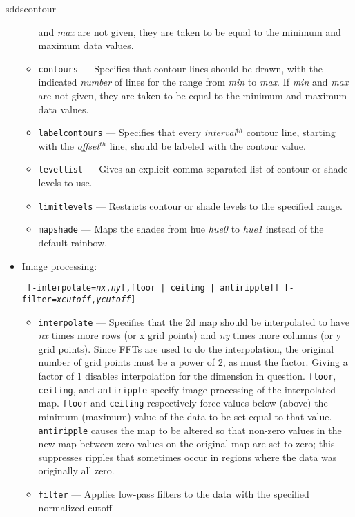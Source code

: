 \begin{sddsprog}{sddscontour}
\begin{itemize}
\begin{itemize}
        and {\em max} are not given, they are taken to be equal to the minimum and maximum data values.
        \item \verb|contours| --- Specifies that contour lines should be drawn, with the
        indicated {\em number} of lines for the range from {\em min} to {\em max}.  If {\em min}
        and {\em max} are not given, they are taken to be equal to the minimum and maximum data values.
        \item \verb|labelcontours| --- Specifies that every {\em interval}$^{th}$ contour line, starting with
        the {\em offset}$^{th}$ line, should be labeled with the contour value.
        \item \verb|levellist| --- Gives an explicit comma-separated list of contour or shade levels to use.
        \item \verb|limitlevels| --- Restricts contour or shade levels to the specified range.
        \item \verb|mapshade| --- Maps the shades from hue {\em hue0} to {\em hue1} instead of the default rainbow.
        \end{itemize}
    \item Image processing:
\begin{flushleft}{\tt
[-interpolate={\em nx},{\em ny}[,{floor | ceiling | antiripple}]] [-filter={\em xcutoff},{\em ycutoff}]
}\end{flushleft}
        \begin{itemize}
        \item \verb|interpolate| --- Specifies that the 2d map should be interpolated to have {\em nx} times
        more rows (or x grid points) and {\em ny} times more columns (or y grid points).  Since FFTs are used to
        do the interpolation, the original number of grid points must be a power of 2, as must the factor.  Giving
        a factor of 1 disables interpolation for the dimension in question.  \verb|floor|, \verb|ceiling|,
        and \verb|antiripple| specify image processing of the interpolated map.  \verb|floor| and \verb|ceiling|
        respectively force values below (above) the minimum (maximum) value of the data to be set equal to that
        value.  \verb|antiripple| causes the map to be altered so that non-zero values in the new map between
        zero values on the original map are set to zero; this suppresses ripples that sometimes occur in regions
        where the data was originally all zero.
        \item \verb|filter| --- Applies low-pass filters to the data with the specified normalized cutoff

\end{itemize}
\end{itemize}
\end{sddsprog}
